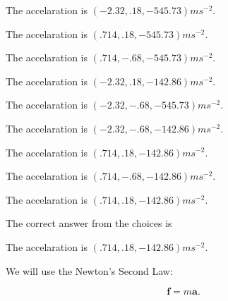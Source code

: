 \documentclass[12pt]{article}
\begin{document}
 
 
The accelaration is $  %
(
-2.32,
.18,
-545.73)
ms^{-2} $.
 
 
The accelaration is $  %
(
.714,
.18,
-545.73)
ms^{-2} $.
 
 
The accelaration is $  %
(
.714,
-.68,
-545.73)
ms^{-2} $.
 
 
The accelaration is $  %
(
-2.32,
.18,
-142.86)
ms^{-2} $.
 
 
The accelaration is $  %
(
-2.32,
-.68,
-545.73)
ms^{-2} $.
 
 
The accelaration is $  %
(
-2.32,
-.68,
-142.86)
ms^{-2} $.
 
 
The accelaration is $  %
(
.714,
.18,
-142.86)
ms^{-2} $.
 
 
The accelaration is $  %
(
.714,
-.68,
-142.86)
ms^{-2} $.
 
 
\noindent{}
 
 
The accelaration is $  %
(
.714,
.18,
-142.86)
ms^{-2} $.
 
 
\noindent{}
 
 
 
 
 
\noindent{}
 
 

The correct answer from the choices is


The accelaration is $  %
(
.714,
.18,
-142.86)
ms^{-2} $.
 
 
 
\noindent{}
 
 

 
 
 
\noindent{}
 
 

We will use the Newton's Second Law:
 
\[
\mathbf{f}=m\mathbf{a}.
\]
 
\end{document}
